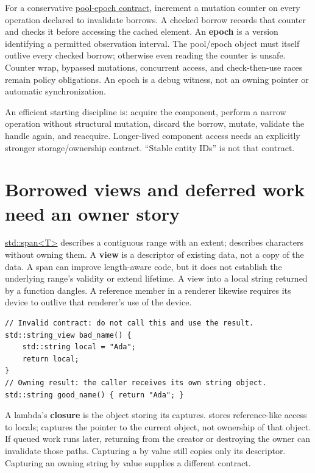 For a conservative \hyperref[appendix-aa405b7c3903]{pool-epoch contract}, increment a mutation counter on every operation declared to invalidate borrows. A checked borrow records that counter and checks it before accessing the cached element. An \textbf{epoch} is a version identifying a permitted observation interval. The pool/epoch object must itself outlive every checked borrow; otherwise even reading the counter is unsafe. Counter wrap, bypassed mutations, concurrent access, and check-then-use races remain policy obligations. An epoch is a debug witness, not an owning pointer or automatic synchronization.

An efficient starting discipline is: acquire the component, perform a narrow operation without structural mutation, discard the borrow, mutate, validate the handle again, and reacquire. Longer-lived component access needs an explicitly stronger storage/ownership contract. ``Stable entity IDs'' is not that contract.

\section{Borrowed views and deferred work need an owner story}\label{01-foundations-i-ch003-borrowed-views-and-deferred-work-need-an-owner-story}

\hypertarget{01-foundations-i-ch003-borrowed-views-and-deferred-work-need-an-owner-story}{}

\hyperref[appendix-aea529eb5175]{std::span\textless T\textgreater{}} describes a contiguous range with an extent;  describes characters without owning them. A \textbf{view} is a descriptor of existing data, not a copy of the data. A span can improve length-aware code, but it does not establish the underlying range's validity or extend lifetime. A view into a local string returned by a function dangles. A reference member in a renderer likewise requires its device to outlive that renderer's use of the device.

\begin{verbatim}
// Invalid contract: do not call this and use the result.
std::string_view bad_name() {
    std::string local = "Ada";
    return local;
}
// Owning result: the caller receives its own string object.
std::string good_name() { return "Ada"; }
\end{verbatim}

A lambda's \textbf{closure} is the object storing its captures. \BookInlineCode{{[}\&{]}} stores reference-like access to locals; \BookInlineCode{{[}this{]}} captures the pointer to the current object, not ownership of that object. If queued work runs later, returning from the creator or destroying the owner can invalidate those paths. Capturing a  by value still copies only its descriptor. Capturing an owning string by value supplies a different contract.

